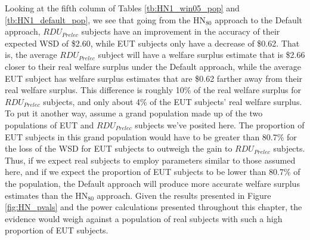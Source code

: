 \documentclass[../main.tex]{subfiles}
\begin{document}
Looking at the fifth column of Tables \ref{tb:HN1_win05_pop} and \ref{tb:HN1_default_pop}, we see that going from the $\text{HN}_{80}$ approach to the Default approach, $\mathit{RDU_{Prelec}}$ subjects have an improvement in the accuracy of their expected WSD of \$2.60, while EUT subjects only have a decrease of \$0.62.
That is, the average $\mathit{RDU_{Prelec}}$ subject will have a welfare surplus estimate that is \$2.66 closer to their real welfare surplus under the Default approach, while the average EUT subject has welfare surplus estimates that are \$0.62 farther away from their real welfare surplus.
This difference is roughly 10\% of the real welfare surplus for $\mathit{RDU_{Prelec}}$ subjects, and only about 4\% of the EUT subjects' real welfare surplus.
To put it another way, assume a grand population made up of the two populations of EUT and $\mathit{RDU_{Prelec}}$ subjects we've posited here.
The proportion of EUT subjects in this grand population would have to be greater than 80.7\% for the loss of the WSD for EUT subjects to outweigh the gain to $\mathit{RDU_{Prelec}}$ subjects.{\footnotemark}
Thus, if we expect real subjects to employ parameters similar to those assumed here, and if we expect the proportion of EUT subjects to be lower than  80.7\% of the population, the Default approach will produce more accurate welfare surplus estimates than the $\text{HN}_{80}$ approach.
Given the results presented in Figure \ref{fig:HN_pvals} and the power calculations presented throughout this chapter, the evidence would weigh against a population of real subjects with such a high proportion of EUT subjects.

\addtocounter{footnote}{-1}
\end{document}

